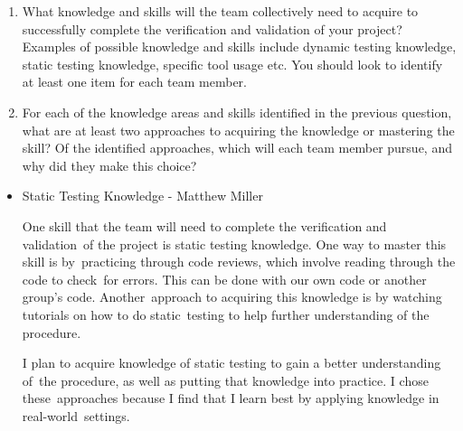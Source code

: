 \documentclass[12pt, titlepage]{article}
\begin{document}
\begin{enumerate}
  \item What knowledge and skills will the team collectively need to acquire to
  successfully complete the verification and validation of your project?
  Examples of possible knowledge and skills include dynamic testing knowledge,
  static testing knowledge, specific tool usage etc.  You should look to
  identify at least one item for each team member.
  \item For each of the knowledge areas and skills identified in the previous
  question, what are at least two approaches to acquiring the knowledge or
  mastering the skill?  Of the identified approaches, which will each team
  member pursue, and why did they make this choice?
\end{enumerate}

\begin{itemize}
	\item Static Testing Knowledge - Matthew Miller
	
	One skill that the team will need to complete the verification and validation\
	of the project is static testing knowledge. One way to master this skill is by\
	practicing through code reviews, which involve reading through the code to check\
	for errors. This can be done with our own code or another group's code. Another\
	approach to acquiring this knowledge is by watching tutorials on how to do static\
	testing to help further understanding of the procedure.

	I plan to acquire knowledge of static testing to gain a better understanding of\
	the procedure, as well as putting that knowledge into practice. I chose these\
	approaches because I find that I learn best by applying knowledge in real-world\
	settings.

\end{itemize}
\end{document}
